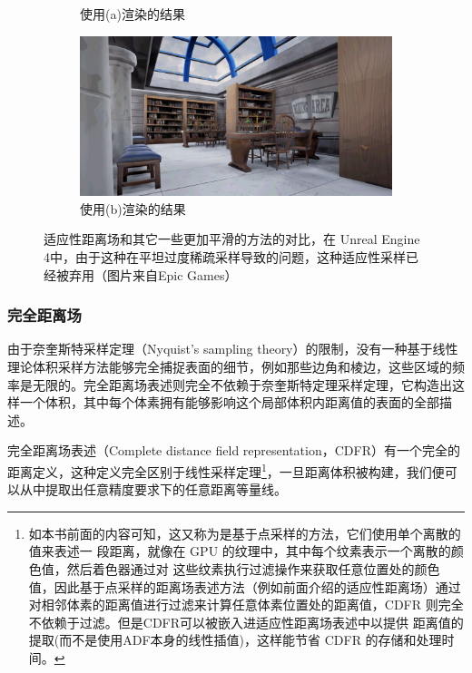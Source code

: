 \begin{figure}
\begin{fullwidth}
\begin{subfigure}[b]{0.5\thewidth}
		\caption{使用(a)渲染的结果}
	\end{subfigure}
	\begin{subfigure}[b]{0.5\thewidth}
		\includegraphics[width=\textwidth]{figures/df/DFAO_Scene_NewMethod}
		\caption{使用(b)渲染的结果}
	\end{subfigure}
	\caption{适应性距离场和其它一些更加平滑的方法的对比，在 Unreal Engine 4中，由于这种在平坦过度稀疏采样导致的问题，这种适应性采样已经被弃用（图片来自Epic Games）}
	\label{f:ue4-adf-problem}
\end{fullwidth}
\end{figure}




\subsubsection{完全距离场}
由于奈奎斯特采样定理（Nyquist’s sampling theory）的限制，没有一种基于线性理论体积采样方法能够完全捕捉表面的细节，例如那些边角和棱边，这些区域的频率是无限的。完全距离场表述则完全不依赖于奈奎斯特定理采样定理，它构造出这样一个体积，其中每个体素拥有能够影响这个局部体积内距离值的表面的全部描述。

完全距离场表述（Complete distance field representation，CDFR）\cite{a:A-Complete-Distance-Field-Representation}有一个完全的距离定义，这种定义完全区别于线性采样定理\footnote{如本书前面的内容可知，这又称为是基于点采样的方法，它们使用单个离散的值来表述一 段距离，就像在 GPU 的纹理中，其中每个纹素表示一个离散的颜色值，然后着色器通过对 这些纹素执行过滤操作来获取任意位置处的颜色值，因此基于点采样的距离场表述方法（例如前面介绍的适应性距离场）通过对相邻体素的距离值进行过滤来计算任意体素位置处的距离值，CDFR 则完全不依赖于过滤。但是CDFR可以被嵌入进适应性距离场表述中以提供 距离值的提取(而不是使用ADF本身的线性插值)，这样能节省 CDFR 的存储和处理时间。}，一旦距离体积被构建，我们便可以从中提取出任意精度要求下的任意距离等量线。

